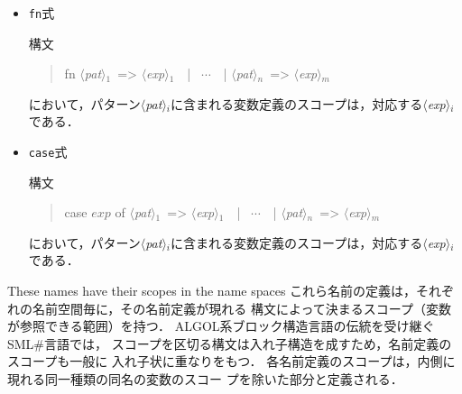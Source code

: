 \documentclass{jbook}
\newcommand{\smlsharp}{SML\#}
\newcommand{\code}[1]{\mbox{\large\tt #1}}
\newcommand{\nonterm}[1]{\mbox{$\langle$}{\it #1}\mbox{$\rangle$}}
\newenvironment{program}{\begin{quote}\begin{tt}}%
                        {\end{tt}\end{quote}}
\begin{document}
\begin{itemize}
\item \code{fn}式

構文
\begin{program}
fn \nonterm{pat}$_1$\  => \nonterm{exp}$_1$\ \ | \ $\cdots$\ \ | \nonterm{pat}$_n$\  => \nonterm{exp}$_m$
\end{program}
において，パターン\nonterm{pat}$_{i}$に含まれる変数定義のスコープは，対応する\nonterm{exp}$_i$である．

\item \code{case}式

構文
\begin{program}
case $exp$ of \nonterm{pat}$_1$\  => \nonterm{exp}$_1$\ \ | \ $\cdots$\ \ | \nonterm{pat}$_n$\  => \nonterm{exp}$_m$
\end{program}
において，パターン\nonterm{pat}$_{i}$に含まれる変数定義のスコープは，対応する\nonterm{exp}$_i$である．
\end{itemize}
	These names have their scopes in the name spaces 
	これら名前の定義は，それぞれの名前空間毎に，その名前定義が現れる
構文によって決まるスコープ（変数が参照できる範囲）を持つ．
	ALGOL系ブロック構造言語の伝統を受け継ぐ\smlsharp{}言語では，
スコープを区切る構文は入れ子構造を成すため，名前定義のスコープも一般に
入れ子状に重なりをもつ．
	各名前定義のスコープは，内側に現れる同一種類の同名の変数のスコー
プを除いた部分と定義される．
	
\end{document}
